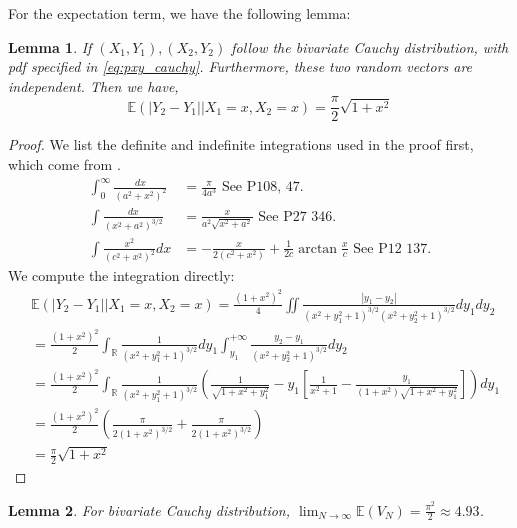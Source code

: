 \documentclass{article}
\newtheorem{lemma}{Lemma}
\def\E{\mathbb{E}}
\def\R{\mathbb{R}}
\begin{document}
For the expectation term, we have the following lemma:
\begin{lemma}
    If $(X_1, Y_1), (X_2, Y_2)$ follow the bivariate Cauchy
    distribution, with pdf specified in \eqref{eq:pxy_cauchy}.
    Furthermore, these two random vectors are independent.
    Then we have,
    \begin{equation}\label{eq:cauchy_conditional_expectation}
        \E(|Y_2-Y_1| \Big\vert X_1= x, X_2=x)
        = \frac{\pi}{2}\sqrt{1+x^2}
    \end{equation}
\end{lemma}
\begin{proof}
We list the definite and indefinite integrations
used in the proof first, which come from \cite{integration}.
\begin{align}
    \int_0^{\infty} \frac{dx}{(a^2+x^2)^2}
    & = \frac{\pi}{4a^3} \textrm{ See P108, 47. } \\
    \int \frac{dx}{(x^2+a^2)^{3/2}}
    & = \frac{x}{a^2\sqrt{x^2+a^2}}
    \textrm{ See P27 346.}
    \label{eq:indefinite_inverse_32}\\
    \int \frac{x^2}{(c^2+x^2)^2}dx
    &=-\frac{x}{2(c^2+x^2)}
    +\frac{1}{2c}\arctan\frac{x}{c}
    \textrm{ See P12 137.}
\end{align}
We compute the integration directly:
\begin{align*}
    &\E\left(|Y_2-Y_1| \Big\vert X_1= x, X_2=x\right)
        =\frac{(1+x^2)^2}{4}\iint \frac{|y_1-y_2|}
        {(x^2+y_1^2+1)^{3/2}(x^2+y_2^2+1)^{3/2}}dy_1dy_2\\
        &=\frac{(1+x^2)^2}{2}\int_{\R}\frac{1}{(x^2+y_1^2+1)^{3/2}}
        dy_1\int_{y_1}^{+\infty}\frac{y_2-y_1}
        {(x^2+y_2^2+1)^{3/2}}dy_2 \\
        &=\frac{(1+x^2)^2}{2}\int_{\R}\frac{1}{(x^2+y_1^2+1)^{3/2}}
        \left(\frac{1}{\sqrt{1+x^2+y_1^2}}-y_1\left[\frac{1}{x^2+1}
        -\frac{y_1}{(1+x^2)\sqrt{1+x^2+y_1^2}}\right]\right)dy_1\\
        &=\frac{(1+x^2)^2}{2} \left(\frac{\pi}{2(1+x^2)^{3/2}}
        +\frac{\pi}{2(1+x^2)^{3/2}}\right)\\
        &=\frac{\pi}{2}\sqrt{1+x^2}
\end{align*}
\end{proof}
\begin{lemma}\label{lem:lim_V_N_2d_cauchy}
    For bivariate Cauchy distribution,
$\lim_{N\to \infty}\E(V_N) = \frac{\pi^2}{2} \approx 4.93$.
\end{lemma}
\end{document}
